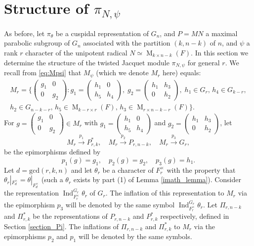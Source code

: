 \documentclass[reqno]{amsart}
\theoremstyle{definition}
\theoremstyle{remark}
\numberwithin{equation}{section}
\DeclareMathOperator{\Ind}{Ind}
\DeclareMathOperator{\M}{M}
\newcommand{\bbsm}{\left (\begin{smallmatrix}}      \newcommand{\besm}{\end{smallmatrix}\right )}
\begin{document}
{{\section{Structure  of $\pi_{N,\psi}$} \label{structure}
As before, let $\pi_\theta$ be a 
cuspidal representation of $G_n$, and $P=MN$  a maximal parabolic subgroup of $G_{n}$ associated with 
the partition $(k,n-k)$ of $n$, and 
$\psi$ a rank $r$ character  of the unipotent radical $N \simeq \M_{k \times n-k}(F)$. In this section we determine the structure of the twisted Jacquet module $\pi_{N, \psi}$ for general $r$.   We recall from \eqref{eq:Mpsi} that $M_{\psi}$ (which we denote $M_r$ here)  equals:
\begin{multline*} \label{eq:Mpsi}
    M_r=\bigg\{ \bbsm g_1&0\\0&g_2 \besm \colon g_1=\bbsm h_1 &  0\\
    h_5 & h_4\besm, \; g_2=\bbsm
    h_1& h_3\\0&h_2 \besm, \; h_1\in G_r, \, h_4\in G_{k-r},\\ h_2\in G_{n-k-r}, \,   
    h_5\in \M_{k-r \times r}(F), \, h_3\in \M_{r \times n-k-r}(F)
    \bigg\}.\end{multline*}
For $g=\bbsm g_1&0\\0&g_2 \besm \in M_r$ with 
$g_1=\bbsm h_1 &  0\\
    h_5 & h_4\besm$ and $g_2=\bbsm
    h_1& h_3\\0&h_2 \besm$, let 
    \[ M_r \xrightarrow{p_1} P^*_{r,k}, \quad M_r \xrightarrow{p_2} P_{r,n-k}, \quad  M_r \xrightarrow{p_3} G_r,\]
    be the epimorphisms defined by 
    \[ p_1(g)=g_1, \quad  p_2(g)=g_2, \quad  p_3(g)=h_1.\]
    Let $d=\text{gcd}(r,k,n)$ and let $\theta_r$ be a character of $F_r^\times$ with the property that $\theta_r|_{F_d^\times} = \theta|_{F_d^\times}$ (such a $\theta_r$ exists by  part (1) of Lemma \ref{imath_lemma}). Consider the representation $\Ind_{F_r^\times}^{G_r} \theta_r$ of $G_r$. The inflation of this representation to $M_r$ via the epimorphism $p_3$ will be denoted by the same symbol $\Ind_{F_r^\times}^{G_r} \theta_r$. Let $\Pi_{r,n-k}$ and $\Pi^*_{r,k}$ be the representations of $P_{r,n-k}$ and $P^*_{r,k}$ respectively, defined in Section \ref{section_Pi}. The inflations of $\Pi_{r,n-k}$ and $\Pi^*_{r,k}$ to $M_r$ via the epimorphisms $p_2$ and $p_1$ will be denoted by the same symbols. 
}}
\end{document}
